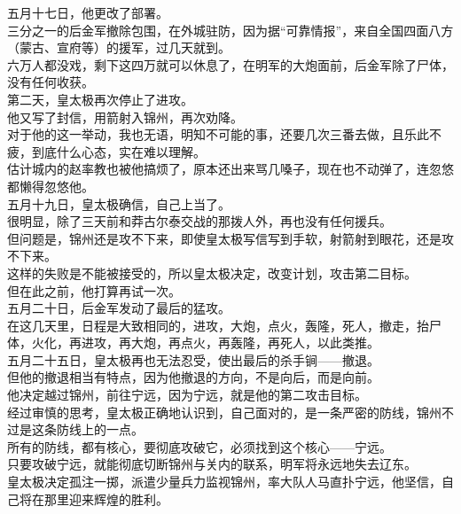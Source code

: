 \begin{multicols}{\theparacolNo}
五月十七日，他更改了部署。\\

三分之一的后金军撤除包围，在外城驻防，因为据“可靠情报”，来自全国四面八方（蒙古、宣府等）的援军，过几天就到。\\

六万人都没戏，剩下这四万就可以休息了，在明军的大炮面前，后金军除了尸体，没有任何收获。\\

第二天，皇太极再次停止了进攻。\\

他又写了封信，用箭射入锦州，再次劝降。\\

对于他的这一举动，我也无语，明知不可能的事，还要几次三番去做，且乐此不疲，到底什么心态，实在难以理解。\\

估计城内的赵率教也被他搞烦了，原本还出来骂几嗓子，现在也不动弹了，连忽悠都懒得忽悠他。\\

五月十九日，皇太极确信，自己上当了。\\

很明显，除了三天前和莽古尔泰交战的那拨人外，再也没有任何援兵。\\

但问题是，锦州还是攻不下来，即使皇太极写信写到手软，射箭射到眼花，还是攻不下来。\\

这样的失败是不能被接受的，所以皇太极决定，改变计划，攻击第二目标。\\

但在此之前，他打算再试一次。\\

五月二十日，后金军发动了最后的猛攻。\\

在这几天里，日程是大致相同的，进攻，大炮，点火，轰隆，死人，撤走，抬尸体，火化，再进攻，再大炮，再点火，再轰隆，再死人，以此类推。\\

五月二十五日，皇太极再也无法忍受，使出最后的杀手锏——撤退。\\

但他的撤退相当有特点，因为他撤退的方向，不是向后，而是向前。\\

他决定越过锦州，前往宁远，因为宁远，就是他的第二攻击目标。\\

经过审慎的思考，皇太极正确地认识到，自己面对的，是一条严密的防线，锦州不过是这条防线上的一点。\\

所有的防线，都有核心，要彻底攻破它，必须找到这个核心——宁远。\\

只要攻破宁远，就能彻底切断锦州与关内的联系，明军将永远地失去辽东。\\

皇太极决定孤注一掷，派遣少量兵力监视锦州，率大队人马直扑宁远，他坚信，自己将在那里迎来辉煌的胜利。\\
\ifnum{}
	\end{multicols}
\fi
\newpage
